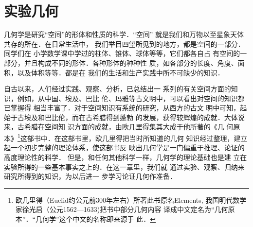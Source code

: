 \chapter{实验几何}

几何学是研究“空间”的形体和性质的科学．“空间”
就是我们和万物以至星象天体共存的所在．在日常生活中，
我们举目四望所见到的地方，都是空间的一部分．同学们在
小学数学课中学过的柱体、锥体、球体等等，它们都各自占
有空间的一部分，并且构成不同的形体．各种形体的种种性
质，如各部分的长度、角度、面积，以及体积等等．都是在
我们的生活和生产实践中所不可缺少的知识．
\begin{figure}[htp]
	\centering
{}	
	\caption{}
\end{figure}

自古以来，人们经过实践、观察、分析，已总结出一
系列的有关空间方面的知识，例如，从中国、埃及、巴比
伦、玛雅等古文明中，可以看出对空间的知识都已掌握得
相当丰富了．对于空间知识有系统的研究，从西方的古文
明中可知，起始于古埃及和巴比伦，而在古希腊得到蓬勃
的发展，获得较辉煌的成就．大体说来，古希腊在空间知
识方面的成就，由欧几里得集其大成于他所著的《几
何原
本》\footnote{欧几里得（Euclid约公元前300年左右）所著此书原名Elements, 
	我国明代数学家徐光启（公元1562---1633)把书中部分几何内容
	译成中文定名为“几何原本”．“几何学”这个中文的名称即来源于
	此．}这部书中．在这部书里，欧几里得把当时所知道的几何
知识经过整理，建立起一个初步完整的理论体系，使这部书反
映出几何学是一门偏重于推理、论证的高度理论性的科学．
但是，和任何其他科学一样，几何学的理论基础也是建
立在实验所得的一些基本事实之上的．在这一章里，我们就
通过实验、观察、归纳来研究所得到的知识，为以后进一
步学习论证几何作准备．


